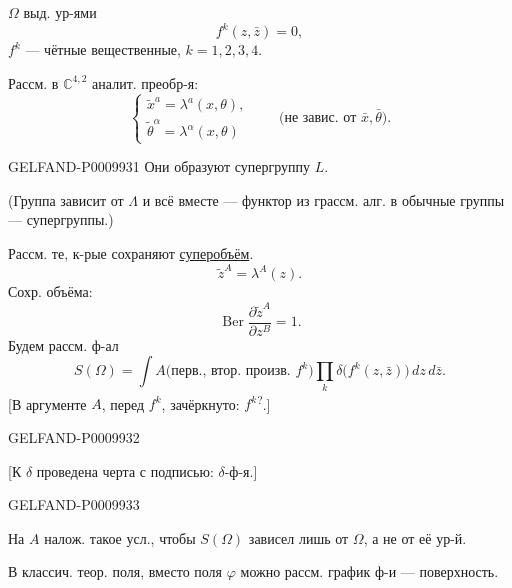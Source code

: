 $\Omega$ выд. ур-ями
\[
f^k(z,\bar z)=0,
\]
$f^k$ --- чётные вещественные, \quad $k=1,2,3,4$.

Рассм. в $\mathbb C^{4,2}$ аналит. преобр-я:
\[
\begin{cases}
\widetilde{x}^{a}=\lambda^{a}(x,\theta),\\
\widetilde{\theta}^{\alpha}=\lambda^{\alpha}(x,\theta)
\end{cases}
\qquad
\text{(не завис. от $\bar x,\bar\theta$)}.
\]


\begin{GelfandAdjacentEvidence}{GELFAND-P000993}{1}
Они образуют супергруппу $L$.

(Группа зависит от $\Lambda$ и всё вместе --- функтор из грассм. алг. в обычные группы --- супергруппы.)

Рассм. те, к-рые сохраняют \underline{суперобъём}.
\[
\widetilde z^{A}=\lambda^{A}(z).
\]
Сохр. объёма:
\[
\operatorname{Ber}\frac{\partial\widetilde z^{A}}{\partial z^{B}}=1.
\]
Будем рассм. ф-ал
\[
S(\Omega)=\int A\bigl(\text{перв., втор. произв. }f^k\bigr)
\prod_k\delta\bigl(f^k(z,\bar z)\bigr)\,dz\,d\bar z.
\]
[В аргументе $A$, перед $f^k$, зачёркнуто: $f^k$\textsuperscript{?}.]
\end{GelfandAdjacentEvidence}
\begin{GelfandAdjacentEvidence}{GELFAND-P000993}{2}


[К $\delta$ проведена черта с подписью: $\delta$-ф-я.]
\end{GelfandAdjacentEvidence}
\begin{GelfandAdjacentEvidence}{GELFAND-P000993}{3}


На $A$ налож. такое усл., чтобы $S(\Omega)$ зависел лишь от $\Omega$, а не от её ур-й.

В классич. теор. поля, вместо поля $\varphi$ можно рассм. график ф-и --- поверхность.

\end{GelfandAdjacentEvidence}
